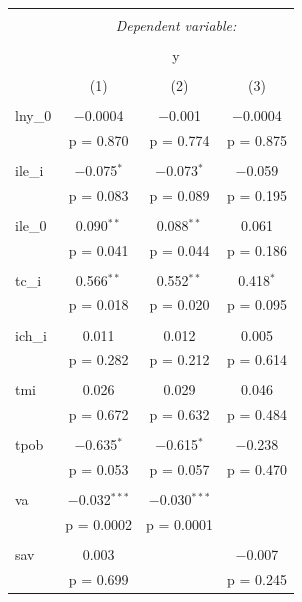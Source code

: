 \begin{table}[!htbp] \centering 
    \tiny
  \caption{} 
  \label{} 
\begin{tabular}{@{\extracolsep{5pt}}lccc} 
\\[-1.8ex]\hline 
\hline \\[-1.8ex] 
 & \multicolumn{3}{c}{\textit{Dependent variable:}} \\ 
\cline{2-4} 
\\[-1.8ex] & \multicolumn{3}{c}{y} \\ 
\\[-1.8ex] & (1) & (2) & (3)\\ 
\hline \\[-1.8ex] 
 lny\_0 & $-$0.0004 & $-$0.001 & $-$0.0004 \\ 
  & p = 0.870 & p = 0.774 & p = 0.875 \\ 
  & & & \\ 
 ile\_i & $-$0.075$^{*}$ & $-$0.073$^{*}$ & $-$0.059 \\ 
  & p = 0.083 & p = 0.089 & p = 0.195 \\ 
  & & & \\ 
 ile\_0 & 0.090$^{**}$ & 0.088$^{**}$ & 0.061 \\ 
  & p = 0.041 & p = 0.044 & p = 0.186 \\ 
  & & & \\ 
 tc\_i & 0.566$^{**}$ & 0.552$^{**}$ & 0.418$^{*}$ \\ 
  & p = 0.018 & p = 0.020 & p = 0.095 \\ 
  & & & \\ 
 ich\_i & 0.011 & 0.012 & 0.005 \\ 
  & p = 0.282 & p = 0.212 & p = 0.614 \\ 
  & & & \\ 
 tmi & 0.026 & 0.029 & 0.046 \\ 
  & p = 0.672 & p = 0.632 & p = 0.484 \\ 
  & & & \\ 
 tpob & $-$0.635$^{*}$ & $-$0.615$^{*}$ & $-$0.238 \\ 
  & p = 0.053 & p = 0.057 & p = 0.470 \\ 
  & & & \\ 
 va & $-$0.032$^{***}$ & $-$0.030$^{***}$ &  \\ 
  & p = 0.0002 & p = 0.0001 &  \\ 
  & & & \\ 
 sav & 0.003 &  & $-$0.007 \\ 
  & p = 0.699 &  & p = 0.245 \\ 

\end{tabular}
\end{table}
